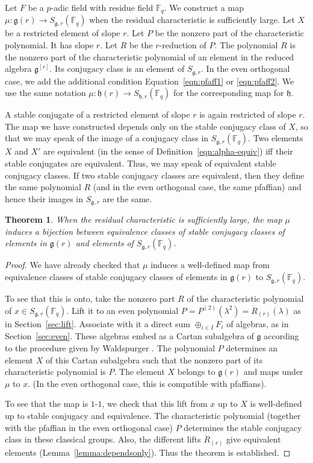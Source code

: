 \documentclass[11pt]{amsart}
\newtheorem{theorem}{Theorem}[section]
\theoremstyle{definition}
\theoremstyle{remark}
\numberwithin{equation}{theorem}
\def\f{{\mathbb{F}_q}}
\def\Fq{{\mathbb F}_q}
\def\lie#1{{\mathfrak{#1}}}
\begin{document}
Let $F$ be a $p$-adic field with residue field $\Fq$.  We
construct a map $\mu:\lie{g}(r) \to S_{\lie{g},r}(\f)$ when the
residual characteristic is sufficiently large. Let $X$ be a
restricted element of slope $r$. Let $P$ be the nonzero part of
the characteristic polynomial.  It has slope $r$.  Let $R$ be the
$r$-reduction of $P$.  The polynomial $R$ is the nonzero part of
the characteristic polynomial of an element in the reduced algebra
$\lie{g}^{[r]}$.  Its conjugacy class is an element of
$S_{\lie{g},r}$.  In the even orthogonal case, we add the
additional condition Equation~\ref{eqn:pfaff1} or
\ref{eqn:pfaff2}.  We use the same notation $\mu:\lie{h}(r)\to
S_{\lie{h},r}(\f)$ for the corresponding map for $\lie{h}$.

A stable conjugate of a restricted  element of slope $r$ is again
restricted  of slope $r$.  The map we have constructed depends
only on the stable conjugacy class of $X$, so that we may speak of
the image of a conjugacy class in $S_{\lie{g},r}(\f)$.  Two
elements $X$ and $X'$ are equivalent (in the sense of
Definition~\ref{eqn:alpha-equiv}) iff their stable conjugates are
equivalent. Thus, we may speak of equivalent stable conjugacy
classes.  If two stable conjugacy classes are equivalent, then
they define the same polynomial $R$ (and in the even orthogonal
case, the same pfaffian) and hence their images in $S_{\lie{g},r}$
are the same.

\begin{theorem} \label{thm:bij}
When the residual characteristic is sufficiently large,
the map $\mu$ induces a bijection between equivalence classes of
stable conjugacy classes of elements in $\lie{g}(r)$ and elements
of $S_{\lie{g},r}(\f)$.
\end{theorem}

\begin{proof}  We have already checked that $\mu$ induces a
well-defined map from equivalence classes of stable conjugacy
classes of elements in $\lie{g}(r)$ to $S_{\lie{g},r}(\f)$.

To see that this is onto, take the nonzero part $R$ of the
characteristic polynomial of $x\in S_{\lie{g},r}(\f)$.  Lift it to
an even polynomial $P=P^{(2)}(\lambda^2) = \dot R_{(r)}(\lambda)$
as in Section~\ref{sec:lift}. Associate with it a direct sum
$\oplus_{i\in I} F_i$ of algebras, as in Section~\ref{sec:even}.
These algebras embed as a Cartan subalgebra of $\lie{g}$ according
to the procedure given by Waldspurger \cite{WA}.  The polynomial
$P$ determines an element $X$ of this Cartan subalgebra such that
the nonzero part of its characteristic polynomial is $P$.  The
element $X$ belongs to $\lie{g}(r)$ and maps under $\mu$ to $x$.
(In the even orthogonal case, this is compatible with pfaffians).

To see that the map is $1$-$1$, we check that this lift from $x$
up to $X$ is well-defined up to stable conjugacy and equivalence.
The characteristic polynomial (together with the pfaffian in the
even orthogonal case) $P$ determines the stable conjugacy class in
these classical groups.  Also, the different lifts $\dot R_{(r)}$
give equivalent elements (Lemma~\ref{lemma:dependsonly}).  Thus
the theorem is established.
\end{proof}
\end{document}
